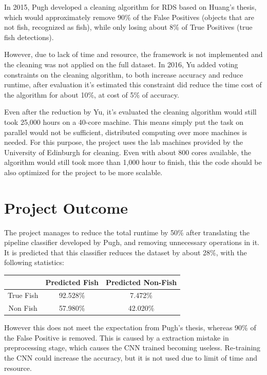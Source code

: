 \documentclass[bsc,logo,twoside,fullspacing,parskip]{infthesis}
\begin{document}
In 2015, Pugh\cite{Pugh} developed a cleaning algorithm for RDS based on Huang's thesis\cite{Huang}, which would approximately remove 90\% of the False Positives (objects that are not fish, recognized as fish), while only losing about 8\% of True Positives (true fish detections). 

However, due to lack of time and resource, the framework is not implemented and the cleaning was not applied on the full dataset.
In 2016, Yu\cite{Yu} added voting constraints on the cleaning algorithm, to both increase accuracy and reduce runtime, after evaluation it's estimated this constraint did reduce the time cost of the algorithm for about 10\%, at cost of 5\% of accuracy.

Even after the reduction by Yu, it's evaluated the cleaning algorithm would still took 25,000 hours on a 40-core machine\cite{Yu}.
This means simply put the task on parallel would not be sufficient, distributed computing over more machines is needed.
For this purpose, the project uses the lab machines provided by the University of Edinburgh for cleaning. 
Even with about 800 cores available, the algorithm would still took more than 1,000 hour to finish, this the code should be also optimized for the project to be more scalable.

\section{Project Outcome}

The project manages to reduce the total runtime by 50\% after translating the pipeline classifier developed by Pugh\cite{Pugh}, and removing unnecessary operations in it. 
It is predicted that this classifier reduces the dataset by about 28\%, with the following statistics:

\newcolumntype{C}{>$c<$}
\begin{center}
\begin{tabular}{ |C|C|C| }
\hline 
$ $ & Predicted Fish & Predicted Non-Fish \\
\hline 
True Fish & 92.528\% & 7.472\% \\
Non Fish & 57.980\% & 42.020\% \\
\hline 
\end{tabular}
\end{center}

However this does not meet the expectation from Pugh's thesis, whereas 90\% of the False Positive is removed. 
This is caused by a extraction mistake in preprocessing stage, which causes the CNN trained becoming useless. 
Re-training the CNN could increase the accuracy, but it is not used due to limit of time and resource.
\end{document}
